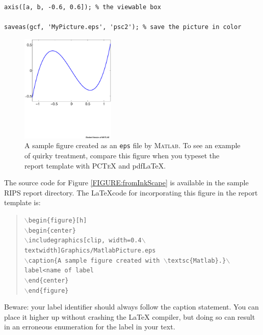 {\begin{verbatim}
axis([a, b, -0.6, 0.6]); % the viewable box

saveas(gcf, 'MyPicture.eps', 'psc2'); % save the picture in color
\end{verbatim}

\begin{figure}[h]
\begin{center}
\includegraphics[clip, width=0.4\textwidth]{Graphics/MatlabPicture.eps}
\caption[A sample figure created as an \texttt{eps} file by \textsc{Matlab}]{A sample figure created as an \texttt{eps} file by \textsc{Matlab}.
To see an example of quirky treatment, compare this figure when you typeset the report template with \textsc{PCTeX} and pdf{\LaTeX}.}\label{FIGURE:fromMatlab}
\end{center}
\end{figure}

The source code for Figure \ref{FIGURE:fromInkScape} is available in the sample RIPS report directory. 
The {\LaTeX}code for incorporating this figure in the report template is:

\vspace{8pt}
\begin{quote} 
{\tt $\backslash$begin\{figure\}[h]\\
{\tt $\backslash$begin\{center\}} \\
{\tt $\backslash$includegraphics[clip, width=0.4$\backslash$textwidth]{Graphics/MatlabPicture.eps}} \\
{\tt $\backslash$caption\{A sample figure created with $\backslash$textsc\{Matlab\}.\}}$\backslash$label{<name of label}}  \\
{\tt $\backslash$end\{center\}} \\
{\tt $\backslash$end\{figure\}}
\end{quote}

Beware: your label identifier should always follow the caption statement.
You can place it higher up without crashing the {\LaTeX} compiler, but doing so can result in an erroneous enumeration for the label in your text.

}
